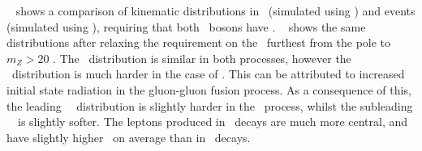 ~ shows a comparison of kinematic distributions in \ggZZ\ 
(simulated using \ggtwoZZ) and \qqZZ events (simulated using \powhegbox), 
requiring that both \Z\ bosons have \sstooos. ~\fig{gen-comp-gg-qq-ZZs} shows 
the same distributions after relaxing the requirement on the \Z\ furthest from 
the pole to $m_{Z}>20$ \gev. The \mZZ\ distribution is similar in both 
processes, however the \ptZZ\ distribution is much harder in the case of \ggZZ.  
This can be attributed to increased initial state radiation in the gluon-gluon 
fusion process. As a consequence of this, the leading \Z\ \pt\ distribution is 
slightly harder in the \ggZZ\ process, whilst the subleading \Z\ \pt\ is 
slightly softer. The leptons produced in \ggZZ\ decays are much more central, 
and have slightly higher \pt\ on average than in \qqZZ\ decays.

